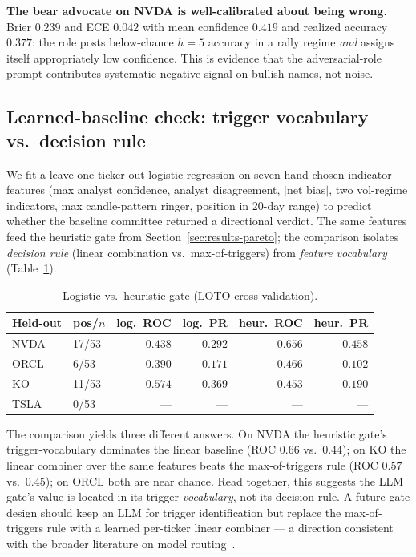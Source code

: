 \documentclass[conference]{IEEEtran}
\begin{document}
\textbf{The bear advocate on NVDA is well-calibrated about being
wrong.}
Brier $0.239$ and ECE $0.042$ with mean confidence $0.419$ and
realized accuracy $0.377$: the role posts below-chance $h{=}5$
accuracy in a rally regime \emph{and} assigns itself appropriately
low confidence. This is evidence that the adversarial-role prompt
contributes systematic negative signal on bullish names, not noise.

\subsection{Learned-baseline check: trigger vocabulary vs.\ decision rule}
\label{sec:results-learned}

We fit a leave-one-ticker-out logistic regression on seven
hand-chosen indicator features (max analyst confidence, analyst
disagreement, $|$net bias$|$, two vol-regime indicators, max
candle-pattern ringer, position in 20-day range) to predict whether
the baseline committee returned a directional verdict. The same
features feed the heuristic gate from
Section~\ref{sec:results-pareto}; the comparison isolates
\emph{decision rule} (linear combination vs.\ max-of-triggers) from
\emph{feature vocabulary} (Table~\ref{tab:learned}).

\begin{table}[t]
\caption{Logistic vs.\ heuristic gate (LOTO cross-validation).}
\label{tab:learned}
\centering\scriptsize
\begin{tabular}{llrrrr}
\toprule
Held-out & pos/$n$ & log.\ ROC & log.\ PR & heur.\ ROC & heur.\ PR \\
\midrule
NVDA & 17/53 & $0.438$ & $0.292$ & $\mathbf{0.656}$ & $\mathbf{0.458}$ \\
ORCL &  6/53 & $0.390$ & $0.171$ & $0.466$ & $0.102$ \\
KO   & 11/53 & $\mathbf{0.574}$ & $\mathbf{0.369}$ & $0.453$ & $0.190$ \\
TSLA &  0/53 & --- & --- & --- & --- \\
\bottomrule
\end{tabular}
\end{table}

The comparison yields three different answers. On NVDA the heuristic
gate's trigger-vocabulary dominates the linear baseline
(ROC $0.66$ vs.\ $0.44$); on KO the linear combiner over the same
features beats the max-of-triggers rule (ROC $0.57$ vs.\ $0.45$); on
ORCL both are near chance. Read together, this suggests the LLM
gate's value is located in its trigger \emph{vocabulary}, not its
decision rule. A future gate design should keep an LLM for trigger
identification but replace the max-of-triggers rule with a learned
per-ticker linear combiner --- a direction consistent with the
broader literature on model routing~\cite{ong2024routellm,
chen2023frugalgpt}.
\end{document}
